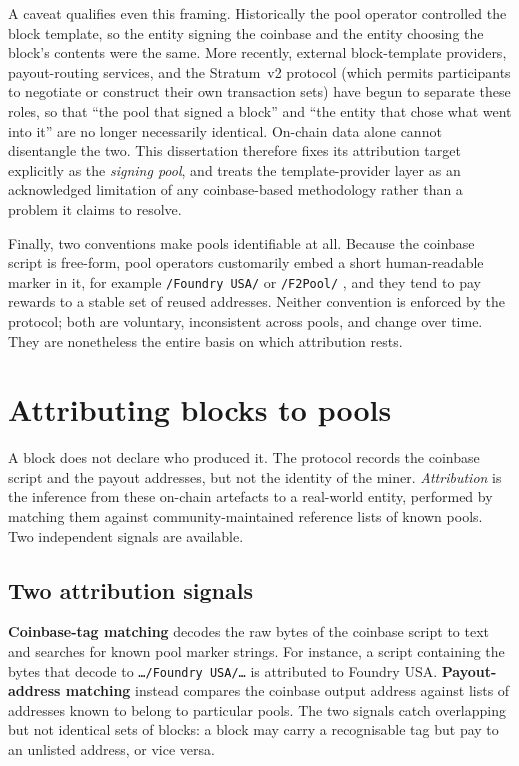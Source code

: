 \documentclass[logo,msc]{infthesis}           %
\begin{document}
A caveat qualifies even this framing. Historically the pool operator controlled
the block template, so the entity signing the coinbase and the entity choosing
the block's contents were the same. More recently, external block-template
providers, payout-routing services, and the Stratum~v2 protocol (which permits
participants to negotiate or construct their own transaction sets) have begun
to separate these roles, so that ``the pool that signed a block'' and ``the
entity that chose what went into it'' are no longer necessarily identical.
On-chain data alone cannot disentangle the two. This dissertation therefore
fixes its attribution target explicitly as the \emph{signing pool}, and treats
the template-provider layer as an acknowledged limitation of any coinbase-based
methodology rather than a problem it claims to resolve.
 
Finally, two conventions make pools identifiable at all. Because the coinbase
script is free-form, pool operators customarily embed a short human-readable
marker in it, for example \texttt{/Foundry USA/} or \texttt{/F2Pool/} , 
and they tend to pay rewards to a stable set of reused addresses. Neither
convention is enforced by the protocol; both are voluntary, inconsistent across
pools, and change over time. They are nonetheless the entire basis on which
attribution rests.
 
\section{Attributing blocks to pools}
\label{sec:bg-attribution}
 
A block does not declare who produced it. The protocol records the coinbase
script and the payout addresses, but not the identity of the miner.
\emph{Attribution} is the inference from these on-chain artefacts to a
real-world entity, performed by matching them against community-maintained
reference lists of known pools. Two independent signals are available.
 
\subsection{Two attribution signals}
 
\textbf{Coinbase-tag matching} decodes the raw bytes of the coinbase script to
text and searches for known pool marker strings. For instance, a script
containing the bytes that decode to \texttt{\dots/Foundry USA/\dots} is
attributed to Foundry USA. \textbf{Payout-address matching} instead compares
the coinbase output address against lists of addresses known to belong to
particular pools. The two signals catch overlapping but not identical sets of
blocks: a block may carry a recognisable tag but pay to an unlisted address, or
vice versa.
 
\end{document}
